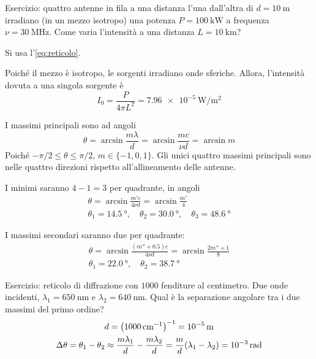 Esercizio: quattro antenne in fila a una distanza l'una dall'altra di $d = \qty{10}{\metre}$ irradiano (in un mezzo isotropo) una potenza $P = \qty{100}{\kilo\watt}$ a frequenza $\nu = \qty{30}{\mega\hertz}$.
Come varia l'intensità a una distanza $L = \qty{10}{\kilo\metre}$?

Si usa l'\cref{eq:reticolo}.

Poiché il mezzo è isotropo, le sorgenti irradiano onde sferiche.
Allora, l'intensità dovuta a una singola sorgente è
\begin{equation}
    I_0 = \frac{P}{4\pi L^2} = \qty{7.96e-5}{\watt\per\meter\squared}
\end{equation}

I massimi principali sono ad angoli
\begin{equation}
    \theta = \arcsin \frac{m \lambda}{d}
    = \arcsin \frac{m c}{\nu d}
    = \arcsin m
\end{equation}
Poiché $-\pi/2 \le \theta \le \pi/2$, $m \in \{-1, 0, 1\}$.
Gli unici quattro massimi principali sono nelle quattro direzioni rispetto all'allineamento delle antenne.

I minimi saranno $4 - 1 = 3$ per quadrante, in angoli
\begin{gather}
    \theta
    = \arcsin \frac{m' c}{4 \nu d}
    = \arcsin \frac{m'}{4} \\
    \theta_1 = \qty{14.5}{\degree}, \quad
    \theta_2 = \qty{30.0}{\degree}, \quad
    \theta_3 = \qty{48.6}{\degree}
\end{gather}

I massimi secondari saranno due per quadrante:
\begin{gather}
    \theta
    = \arcsin \frac{(m'' + 0.5) c}{4 \nu d}
    = \arcsin \frac{2m'' + 1}{8} \\
    \theta_1 = \qty{22.0}{\degree}, \quad
    \theta_2 = \qty{38.7}{\degree}
\end{gather}


Esercizio: reticolo di diffrazione con $1000$ fenditure al centimetro. Due onde incidenti, $\lambda_1 = \qty{650}{\nano\metre}$ e $\lambda_2 = \qty{640}{\nano\metre}$.
Qual è la separazione angolare tra i due massimi del primo ordine?
\begin{gather}
    d = \left( \qty{1000}{\per\centi\meter} \right)^{-1} = \qty{e-5}{\metre} \\
    \Delta \theta = \theta_1 - \theta_2
    \approx \frac{m \lambda_1}{d} - \frac{m \lambda_2}{d}
    = \frac{m}{d}(\lambda_1 - \lambda_2)
    = \qty{e-3}{\radian}
\end{gather}

